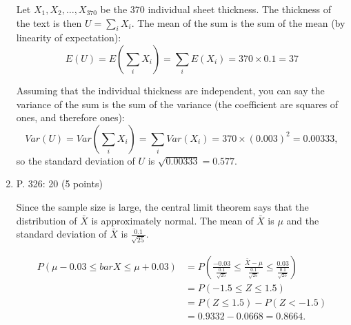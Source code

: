\documentclass{article}\usepackage[]{graphicx}\usepackage[]{color}
\begin{document}
\begin{enumerate}
	{\color{red}
	Let $X_1, X_2, \ldots, X_{370}$ be the 370 individual sheet thickness. The thickness of the text is then $U = \sum_{i} X_i$. The mean of the sum is the sum of the mean (by linearity of expectation):
	\[E(U) = E(\sum_{i} X_i) = \sum_{i} E(X_i) = 370 \times 0.1 = 37\]
	
	Assuming that the individual thickness are  independent, you can say the variance of the sum is the sum of the variance (the coefficient are squares of ones, and therefore ones):
	\[Var(U) = Var(\sum_{i} X_i) = \sum_{i} Var(X_i) = 370 \times (0.003)^2 = 0.00333,\]
	so the standard deviation of $U$ is $\sqrt{0.00333} = 0.577$.
	}
	\item P. 326: 20 (5 points)
	
	{\color{red}
	Since the sample size is large, the central limit theorem says that the distribution of $\bar{X}$ is approximately normal. The mean of $\bar{X}$ is $\mu$ and the standard deviation of $\bar{X}$ is $\frac{0.1}{\sqrt{25}}$.
	
	\begin{align*}
	P(\mu - 0.03 \leq bar{X} \leq \mu + 0.03) &= P\left(\frac{-0.03}{\frac{0.1}{\sqrt{25}}} \leq \frac{\bar{X} - \mu}{\frac{0.1}{\sqrt{25}}} \leq \frac{0.03}{\frac{0.1}{\sqrt{25}}}\right)\\
	& = P(-1.5 \leq Z \leq 1.5)\\
	& = P(Z \leq 1.5) - P(Z < -1.5)\\
	& = 0.9332 - 0.0668 = 0.8664.
	\end{align*}
	}

\end{enumerate}


% 
%
\end{document}
